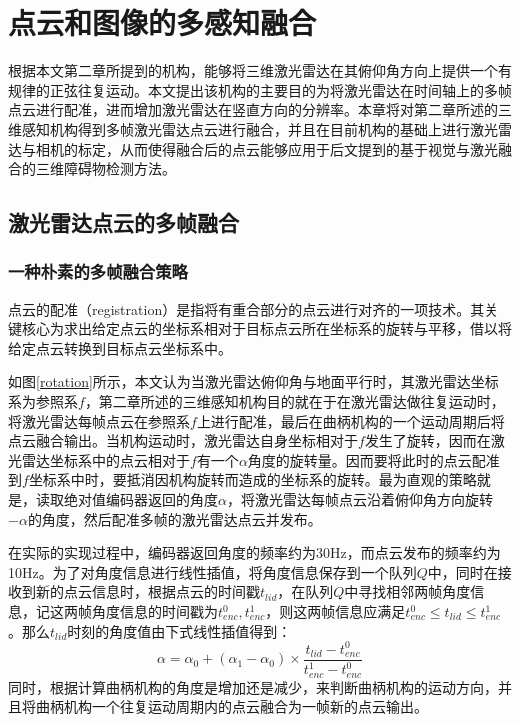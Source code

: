 

\chapter{点云和图像的多感知融合}
根据本文第二章所提到的机构，能够将三维激光雷达在其俯仰角方向上提供一个有规律的正弦往复运动。本文提出该机构的主要目的为将激光雷达在时间轴上的多帧点云进行配准，进而增加激光雷达在竖直方向的分辨率。本章将对第二章所述的三维感知机构得到多帧激光雷达点云进行融合，并且在目前机构的基础上进行激光雷达与相机的标定，从而使得融合后的点云能够应用于后文提到的基于视觉与激光融合的三维障碍物检测方法。

\section{激光雷达点云的多帧融合}

\subsection{一种朴素的多帧融合策略}
点云的配准（registration）是指将有重合部分的点云进行对齐的一项技术。其关键核心为求出给定点云的坐标系相对于目标点云所在坐标系的旋转与平移，借以将给定点云转换到目标点云坐标系中。


如图\ref{rotation}所示，本文认为当激光雷达俯仰角与地面平行时，其激光雷达坐标系为参照系$f$，第二章所述的三维感知机构目的就在于在激光雷达做往复运动时，将激光雷达每帧点云在参照系$f$上进行配准，最后在曲柄机构的一个运动周期后将点云融合输出。当机构运动时，激光雷达自身坐标相对于$f$发生了旋转，因而在激光雷达坐标系中的点云相对于$f$有一个$\alpha$角度的旋转量。因而要将此时的点云配准到$f$坐标系中时，要抵消因机构旋转而造成的坐标系的旋转。最为直观的策略就是，读取绝对值编码器返回的角度$\alpha$，将激光雷达每帧点云沿着俯仰角方向旋转$-\alpha$的角度，然后配准多帧的激光雷达点云并发布。

在实际的实现过程中，编码器返回角度的频率约为30Hz，而点云发布的频率约为10Hz。为了对角度信息进行线性插值，将角度信息保存到一个队列$Q$中，同时在接收到新的点云信息时，根据点云的时间戳$t_{lid}$，在队列$Q$中寻找相邻两帧角度信息，记这两帧角度信息的时间戳为$t_{enc}^0, t_{enc}^1$，则这两帧信息应满足$t_{enc}^0 \leq t_{lid} \leq t_{enc}^1$。那么$t_{lid}$时刻的角度值由下式线性插值得到：
\begin{equation}
    \alpha = \alpha_0+(\alpha_1-\alpha_0)\times \frac{t_{lid} - t_{enc}^0}{t_{enc}^1 - t_{enc}^0}
\end{equation}
同时，根据计算曲柄机构的角度是增加还是减少，来判断曲柄机构的运动方向，并且将曲柄机构一个往复运动周期内的点云融合为一帧新的点云输出。

